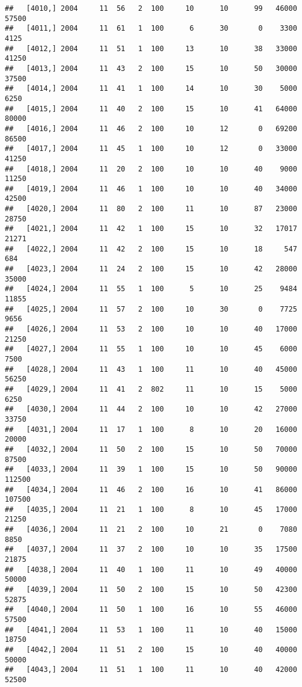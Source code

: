 \documentclass{article}\usepackage[]{graphicx}\usepackage[]{color}
\makeatletter
\newenvironment{kframe}{%
 \def\at@end@of@kframe{}%
 \ifinner\ifhmode%
  \def\at@end@of@kframe{\end{minipage}}%
  \begin{minipage}{\columnwidth}%
 \fi\fi%
 \def\FrameCommand##1{\hskip\@totalleftmargin \hskip-\fboxsep
 \colorbox{shadecolor}{##1}\hskip-\fboxsep
     \hskip-\linewidth \hskip-\@totalleftmargin \hskip\columnwidth}%
 \MakeFramed {\advance\hsize-\width
   \@totalleftmargin\z@ \linewidth\hsize
   \@setminipage}}%
 {\par\unskip\endMakeFramed%
 \at@end@of@kframe}
\newenvironment{knitrout}{}{} %
\makeatother
\begin{document}
\begin{knitrout}
\begin{kframe}
\begin{verbatim}
##   [4010,] 2004     11  56   2  100     10      10      99   46000   57500
##   [4011,] 2004     11  61   1  100      6      30       0    3300    4125
##   [4012,] 2004     11  51   1  100     13      10      38   33000   41250
##   [4013,] 2004     11  43   2  100     15      10      50   30000   37500
##   [4014,] 2004     11  41   1  100     14      10      30    5000    6250
##   [4015,] 2004     11  40   2  100     15      10      41   64000   80000
##   [4016,] 2004     11  46   2  100     10      12       0   69200   86500
##   [4017,] 2004     11  45   1  100     10      12       0   33000   41250
##   [4018,] 2004     11  20   2  100     10      10      40    9000   11250
##   [4019,] 2004     11  46   1  100     10      10      40   34000   42500
##   [4020,] 2004     11  80   2  100     11      10      87   23000   28750
##   [4021,] 2004     11  42   1  100     15      10      32   17017   21271
##   [4022,] 2004     11  42   2  100     15      10      18     547     684
##   [4023,] 2004     11  24   2  100     15      10      42   28000   35000
##   [4024,] 2004     11  55   1  100      5      10      25    9484   11855
##   [4025,] 2004     11  57   2  100     10      30       0    7725    9656
##   [4026,] 2004     11  53   2  100     10      10      40   17000   21250
##   [4027,] 2004     11  55   1  100     10      10      45    6000    7500
##   [4028,] 2004     11  43   1  100     11      10      40   45000   56250
##   [4029,] 2004     11  41   2  802     11      10      15    5000    6250
##   [4030,] 2004     11  44   2  100     10      10      42   27000   33750
##   [4031,] 2004     11  17   1  100      8      10      20   16000   20000
##   [4032,] 2004     11  50   2  100     15      10      50   70000   87500
##   [4033,] 2004     11  39   1  100     15      10      50   90000  112500
##   [4034,] 2004     11  46   2  100     16      10      41   86000  107500
##   [4035,] 2004     11  21   1  100      8      10      45   17000   21250
##   [4036,] 2004     11  21   2  100     10      21       0    7080    8850
##   [4037,] 2004     11  37   2  100     10      10      35   17500   21875
##   [4038,] 2004     11  40   1  100     11      10      49   40000   50000
##   [4039,] 2004     11  50   2  100     15      10      50   42300   52875
##   [4040,] 2004     11  50   1  100     16      10      55   46000   57500
##   [4041,] 2004     11  53   1  100     11      10      40   15000   18750
##   [4042,] 2004     11  51   2  100     15      10      40   40000   50000
##   [4043,] 2004     11  51   1  100     11      10      40   42000   52500

\end{verbatim}
\end{kframe}
\end{knitrout}
\end{document}
